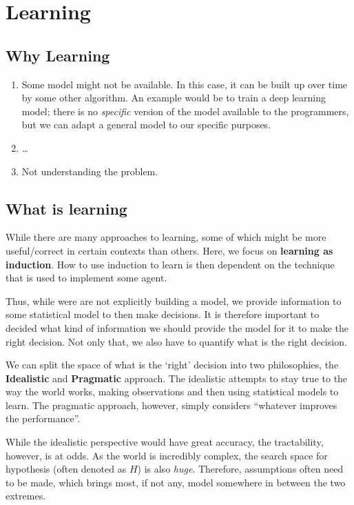 \documentclass[
]{book}
\begin{document}
\hypertarget{learning}{%
\chapter{Learning}\label{learning}}

\hypertarget{why-learning}{%
\section{Why Learning}\label{why-learning}}

\begin{enumerate}
\def\labelenumi{\arabic{enumi}.}
\item
  Some model might not be available. In this case, it can be built up
  over time by some other algorithm. An example would be to train a deep
  learning model; there is no \emph{specific} version of the model
  available to the programmers, but we can adapt a general model to our
  specific purposes.
\item
  \ldots{}
\item
  Not understanding the problem.
\end{enumerate}

\hypertarget{what-is-learning}{%
\section{What is learning}\label{what-is-learning}}

While there are many approaches to learning, some of which might be more
useful/correct in certain contexts than others. Here, we focus on
\textbf{learning as induction}. How to use induction to learn is then
dependent on the technique that is used to implement some agent.

Thus, while were are not explicitly building a model, we provide
information to some statistical model to then make decisions. It is
therefore important to decided what kind of information we should
provide the model for it to make the right decision. Not only that, we
also have to quantify what is the right decision.

We can split the space of what is the `right' decision into two
philosophies, the \textbf{Idealistic} and \textbf{Pragmatic} approach.
The idealistic attempts to stay true to the way the world works, making
observations and then using statistical models to learn. The pragmatic
approach, however, simply considers ``whatever improves the
performance''.

While the idealistic perspective would have great accuracy, the
tractability, however, is at odds. As the world is incredibly complex,
the search space for hypothesis (often denoted as \(H\)) is also
\emph{huge}. Therefore, assumptions often need to be made, which brings
most, if not any, model somewhere in between the two extremes.
\end{document}
